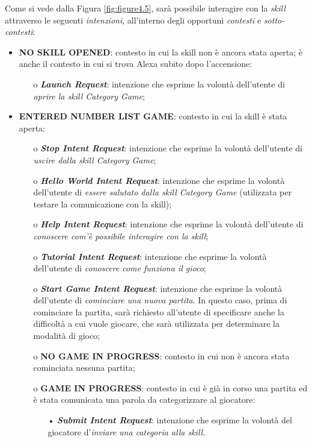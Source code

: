 Come si vede dalla Figura \ref{fig:figure4.5}, sarà possibile interagire con la
\textit{skill} attraverso le seguenti \textit{intenzioni}, all’interno degli
opportuni \textit{contesti} e \textit{sotto-contesti}:
\begin{itemize}
  \item \textbf{NO SKILL OPENED}: contesto in cui la skill non è ancora stata
        aperta; è anche il contesto in cui si trova Alexa subito dopo
        l’accensione:
        \begin{itemize}
          \item[o] \textit{\textbf{Launch Request}}: intenzione che esprime la
                volontà dell’utente di \textit{aprire la skill Category Game};
        \end{itemize}
  \item \textbf{ENTERED NUMBER LIST GAME}: contesto in cui la skill è stata
        aperta:
        \begin{itemize}
          \item[o] \textit{\textbf{Stop Intent Request}}: intenzione che
                esprime la volontà dell’utente di \textit{uscire dalla skill
                Category Game};
          \item[o] \textit{\textbf{Hello World Intent Request}}: intenzione che
                esprime la volontà dell’utente di \textit{essere salutato dalla
                skill Category Game} (utilizzata per testare la comunicazione
                con la skill);
          \item[o] \textit{\textbf{Help Intent Request}}: intenzione che
                esprime la volontà dell’utente di \textit{conoscere com’è
                possibile interagire con la skill};
          \item[o] \textit{\textbf{Tutorial Intent Request}}: intenzione che
                esprime la volontà dell’utente di \textit{conoscere come
                funziona il gioco};
          \item[o] \textit{\textbf{Start Game Intent Request}}: intenzione che
                esprime la volontà dell’utente di \textit{cominciare una nuova
                partita}. In questo caso, prima di cominciare la partita, sarà
                richiesto all’utente di specificare anche la difficoltà a cui
                vuole giocare, che sarà utilizzata per determinare la modalità
                di gioco;
          \item[o] \textbf{NO GAME IN PROGRESS}: contesto in cui non è ancora
                stata cominciata nessuna partita;
          \item[o] \textbf{GAME IN PROGRESS}: contesto in cui è già in corso
                una partita ed è stata comunicata una parola da categorizzare
                al giocatore:
                \begin{itemize}
                  \item[•] \textit{\textbf{Submit Intent Request}}: intenzione
                        che esprime la volontà del giocatore
                        d'\textit{inviare una categoria alla skill}.
                \end{itemize}
        \end{itemize}
\end{itemize}


